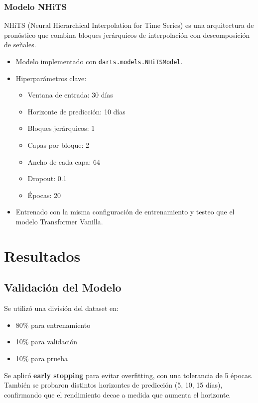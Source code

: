 \documentclass[12pt]{article}
\begin{document}
\subsubsection{Modelo NHiTS}

NHiTS (Neural Hierarchical Interpolation for Time Series) es una arquitectura de pronóstico que combina bloques jerárquicos de interpolación con descomposición de señales.

\begin{itemize}
\item Modelo implementado con \texttt{darts.models.NHiTSModel}.
\item Hiperparámetros clave:
\begin{itemize}
\item Ventana de entrada: 30 días
\item Horizonte de predicción: 10 días
\item Bloques jerárquicos: 1
\item Capas por bloque: 2
\item Ancho de cada capa: 64
\item Dropout: 0.1
\item Épocas: 20
\end{itemize}
\item Entrenado con la misma configuración de entrenamiento y testeo que el modelo Transformer Vanilla.
\end{itemize}


\newpage
\section{Resultados}
\label{sec:resultados}

\subsection{Validación del Modelo}

Se utilizó una división del dataset en:
\begin{itemize}
\item 80\% para entrenamiento
\item 10\% para validación
\item 10\% para prueba
\end{itemize}

Se aplicó \textbf{early stopping} para evitar overfitting, con una tolerancia de 5 épocas. También se probaron distintos horizontes de predicción (5, 10, 15 días), confirmando que el rendimiento decae a medida que aumenta el horizonte.
\end{document}
